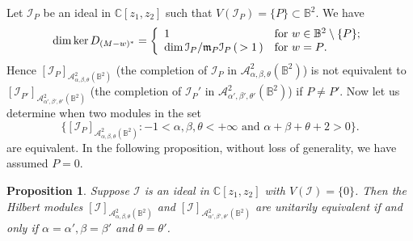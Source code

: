 \documentclass[11pt]{amsart}
\newtheorem{prop}[thm]{Proposition}
\theoremstyle{definition}
\numberwithin{equation}{section}
\begin{document}
Let $\mathcal I_P$ be an ideal in ${{\mathbb C}}[z_1,z_2]$ such that $V(\mathcal I_P) = \{P\}\subset\mathbb B^2$. We have
\begin{eqnarray*}
\dim \ker D_{(M - w)^*}=\left\{
\begin{array}{ll}
1 & \hbox{for $w\in{{\mathbb B}^2\setminus\{P\}}$;} \\
\dim \mathcal I_P/\mathfrak m_P\mathcal I_P\,(\,>1\,) & \hbox{for $w=P$.}
\end{array}
\right.
\end{eqnarray*}
Hence $[\mathcal I_P]_{{\mathcal A}^2_{\alpha,\beta,\theta}(\mathbb B^2)}$ (the completion of $\mathcal I_P$ in ${{\mathcal A}^2_{\alpha,\beta,\theta}(\mathbb B^2)}$) is not equivalent to $[\mathcal I_{P'}]_{{\mathcal A}^2_{\alpha',\beta',\theta'}(\mathbb B^2)}$ (the completion of $\mathcal I_P'$ in ${{\mathcal A}^2_{\alpha',\beta',\theta'}(\mathbb B^2)}$) if $P\neq P'$. Now let us determine
when two modules in the set
$$
\{[\mathcal I_P]_{{\mathcal A}^2_{\alpha,\beta,\theta}(\mathbb B^2)}: -1<\alpha,\beta,\theta<+\infty \mbox{~and~}\alpha+\beta+\theta +2>0\}.
$$ 
are equivalent. In the following
proposition, without loss of generality, we have assumed $P=0$. 

\begin{prop}
Suppose $\mathcal I$ is an ideal in ${{\mathbb C}}[z_1,z_2]$ with $V(\mathcal I) = \{0\}$. Then the Hilbert modules $[\mathcal I]_{{\mathcal A}^2_{\alpha,\beta,\theta}(\mathbb B^2)}$ and $[\mathcal I]_{{\mathcal A}^2_{\alpha',\beta',\theta'}(\mathbb B^2)}$ are unitarily equivalent if and only
if $\alpha=\alpha', \beta = \beta'$ and $\theta=\theta'$.
\end{prop}
\end{document}
